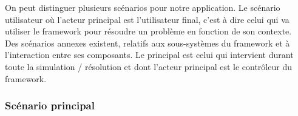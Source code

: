 On peut distinguer plusieurs scénarios pour notre application. Le scénario utilisateur où l'acteur principal est l'utilisateur final, c'est à dire celui qui va utiliser le framework pour résoudre un problème en fonction de son contexte.\\

Des scénarios annexes existent, relatifs aux sous-systèmes du framework et à l’interaction entre ses composants. Le principal est celui qui intervient durant toute la simulation / résolution et dont l'acteur principal est le contrôleur du framework.

%
\subsubsection{Scénario principal}

\renewcommand{\labelitemii}{$\hookrightarrow$}
\renewcommand{\labelitemiii}{$\circ$}
